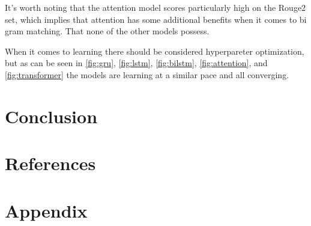 \documentclass{article}
\begin{document}
It's worth noting that the attention model scores particularly high on the Rouge2 set, which implies that attention has some additional benefits when it comes to bi gram matching. That none of the other models possess.

When it comes to learning there should be considered hyperpareter optimization, but as can be seen in \ref{fig:gru}, \ref{fig:lstm}, \ref{fig:bilstm}, \ref{fig:attention}, and \ref{fig:transformer} the models are learning at a similar pace and all converging. 

\section{Conclusion}

\section{References}


\section{Appendix}
\end{document}
